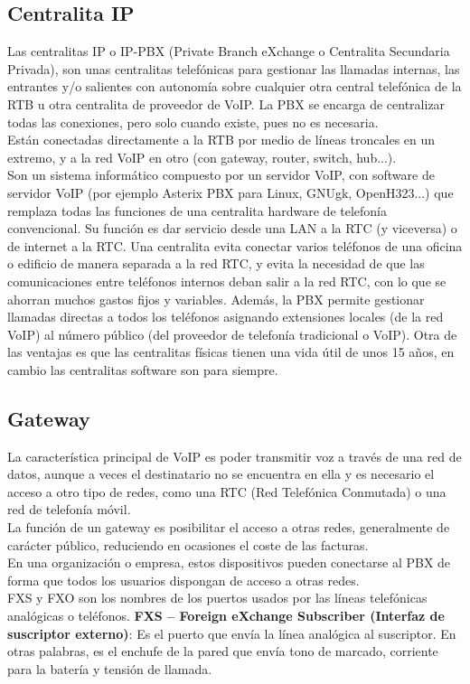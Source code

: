 \documentclass[
	12pt, %
	fleqn, %
	a4paper, %
	oneside, %
]{LegrandOrangeBook}
\begin{document}
\subsection{Centralita IP}
Las centralitas IP o IP-PBX (Private Branch eXchange o Centralita Secundaria Privada), son unas centralitas telefónicas para gestionar las llamadas internas, las entrantes y/o salientes con autonomía sobre cualquier otra central telefónica de la RTB u otra centralita de proveedor de VoIP. La PBX se encarga de centralizar todas las conexiones, pero solo cuando existe, pues no es necesaria.\\
Están conectadas directamente a la RTB por medio de líneas troncales en un extremo, y a la red VoIP en otro (con gateway, router, switch, hub...).\\
Son un sistema informático compuesto por un servidor VoIP, con software de servidor VoIP (por ejemplo Asterix PBX para Linux, GNUgk, OpenH323...) que remplaza todas las funciones de una centralita hardware de telefonía convencional. Su función es dar servicio desde una LAN a la RTC (y viceversa) o de internet a la RTC. Una centralita evita conectar varios teléfonos de una oficina o edificio de manera separada a la red RTC, y evita la necesidad de que las comunicaciones entre teléfonos internos deban salir a la red RTC, con lo que se ahorran muchos gastos fijos y variables. Además, la PBX permite gestionar llamadas directas a todos los teléfonos asignando extensiones locales (de la red VoIP) al número público (del proveedor de telefonía tradicional o VoIP). Otra de las ventajas es que las centralitas físicas tienen una vida útil de unos 15 años, en cambio las centralitas software son para siempre.
\subsection{Gateway}
La característica principal de VoIP es poder transmitir voz a través de una red de datos, aunque a veces el destinatario no se encuentra en ella y es necesario el acceso a otro tipo de redes, como una RTC (Red Telefónica Conmutada) o una red de telefonía móvil.\\
La función de un gateway es posibilitar el acceso a otras redes, generalmente de carácter público, reduciendo en ocasiones el coste de las facturas.\\
En una organización o empresa, estos dispositivos pueden conectarse al PBX de forma que todos los usuarios dispongan de acceso a otras redes.\\
FXS y FXO son los nombres de los puertos usados por las líneas telefónicas analógicas o teléfonos.
\textbf{FXS – Foreign eXchange Subscriber (Interfaz de suscriptor externo)}: Es el puerto que envía la línea analógica al suscriptor. En otras palabras, es el enchufe de la pared que envía tono de marcado, corriente para la batería y tensión de llamada.
\end{document}
